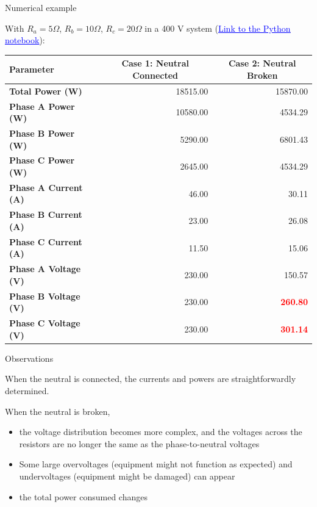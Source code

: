\begin{frame}[allowframebreaks]{Numerical example}



With $R_a= 5\Omega$, $R_b= 10\Omega$, $R_c= 20\Omega$ in a 400 V system
    (\href{https://colab.research.google.com/drive/1pXH21c8g9Hv3h94pb81OtuFVQfauG63T?usp=sharing}{\textcolor{blue}{\underline{Link to the Python notebook}}}): 

\begin{center}
    \small
\begin{tabular}{|l|r|r|}
\hline
\textbf{Parameter} & \multicolumn{1}{c|}{\textbf{Case 1: Neutral Connected}} & \multicolumn{1}{c|}{\textbf{Case 2: Neutral Broken}} \\
\hline
\textbf{Total Power (W)} & 18515.00 & 15870.00 \\
\textbf{Phase A Power (W)} & 10580.00 & 4534.29 \\
\textbf{Phase B Power (W)} & 5290.00 & 6801.43 \\
\textbf{Phase C Power (W)} & 2645.00 & 4534.29 \\
\hline
\textbf{Phase A Current (A)} & 46.00 & 30.11 \\
\textbf{Phase B Current (A)} & 23.00 & 26.08 \\
\textbf{Phase C Current (A)} & 11.50 & 15.06 \\
\hline
\textbf{Phase A Voltage (V)} & 230.00 & \alert{150.57} \\
\textbf{Phase B Voltage (V)} & 230.00 & \textcolor{red}{\bf 260.80} \\
\textbf{Phase C Voltage (V)} & 230.00 & \textcolor{red}{\bf 301.14} \\
\hline
\end{tabular}
\end{center}



\end{frame}

\begin{frame}{Observations}
    
    When the neutral is connected, the currents and powers are straightforwardly determined.

    When the neutral is broken, 
    \begin{itemize}
        \item the voltage distribution becomes more complex, and the voltages across the resistors are no longer the same as the phase-to-neutral voltages
        \item Some large overvoltages (equipment might not function as expected) and undervoltages (equipment might be damaged) can appear
        \item the total power consumed changes
    \end{itemize}
\end{frame}




